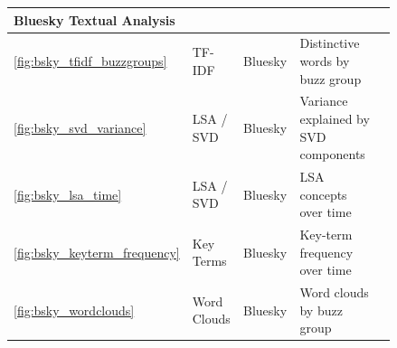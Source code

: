 \begin{longtable}{|p{0.05\linewidth}|p{0.14\linewidth}|p{0.16\linewidth}|p{0.43\linewidth}|p{0.06\linewidth}|}
\multicolumn{5}{|l|}{\rule[-0.3em]{0pt}{1.2em}\textcolor{textprimary}{\sffamily\bfseries\small\enspace 3 \enspace Bluesky Textual Analysis}} \\
\hline
\textcolor{textmuted}{\small\ref{fig:bsky_tfidf_buzzgroups}}       & \textcolor{textmuted}{\small TF-IDF}           & \textcolor{textmuted}{\small Bluesky}         & \textcolor{textmuted}{\small Distinctive words by buzz group}          & \textcolor{textmuted}{\small\pageref{fig:bsky_tfidf_buzzgroups}} \\\hline
\textcolor{textmuted}{\small\ref{fig:bsky_svd_variance}}           & \textcolor{textmuted}{\small LSA / SVD}        & \textcolor{textmuted}{\small Bluesky}         & \textcolor{textmuted}{\small Variance explained by SVD components}     & \textcolor{textmuted}{\small\pageref{fig:bsky_svd_variance}} \\\hline
\textcolor{textmuted}{\small\ref{fig:bsky_lsa_time}}               & \textcolor{textmuted}{\small LSA / SVD}        & \textcolor{textmuted}{\small Bluesky}         & \textcolor{textmuted}{\small LSA concepts over time}                   & \textcolor{textmuted}{\small\pageref{fig:bsky_lsa_time}} \\\hline
\textcolor{textmuted}{\small\ref{fig:bsky_keyterm_frequency}}      & \textcolor{textmuted}{\small Key Terms}        & \textcolor{textmuted}{\small Bluesky}         & \textcolor{textmuted}{\small Key-term frequency over time}             & \textcolor{textmuted}{\small\pageref{fig:bsky_keyterm_frequency}} \\\hline
\textcolor{textmuted}{\small\ref{fig:bsky_wordclouds}}             & \textcolor{textmuted}{\small Word Clouds}      & \textcolor{textmuted}{\small Bluesky}         & \textcolor{textmuted}{\small Word clouds by buzz group}                & \textcolor{textmuted}{\small\pageref{fig:bsky_wordclouds}} \\\hline


\end{longtable}
